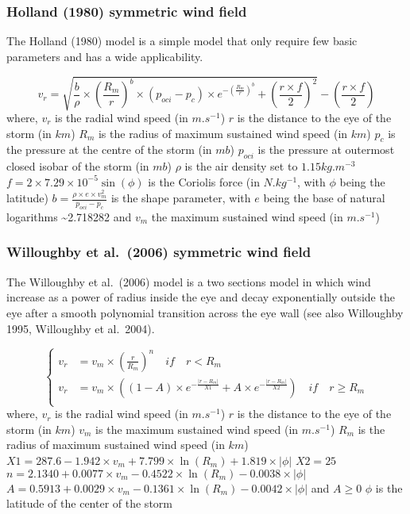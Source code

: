 \documentclass[
]{article}
\begin{document}
\hypertarget{holland-1980-symmetric-wind-field}{%
\subsubsection{Holland (1980) symmetric wind
field}\label{holland-1980-symmetric-wind-field}}

The Holland (1980) model is a simple model that only require few basic
parameters and has a wide applicability.

\[
v_r = \sqrt{\frac{b}{\rho} \times \left(\frac{R_m}{r}\right)^b \times (p_{oci} - p_c) \times e^{-\left(\frac{R_m}{r}\right)^b} + \left(\frac{r \times f}{2}\right)^2} - \left(\frac{r \times f}{2}\right)
\] where, \(v_r\) is the radial wind speed (in \(m.s^{-1}\)) \(r\) is
the distance to the eye of the storm (in \(km\)) \(R_m\) is the radius
of maximum sustained wind speed (in \(km\)) \(p_c\) is the pressure at
the centre of the storm (in \(mb\)) \(p_{oci}\) is the pressure at
outermost closed isobar of the storm (in \(mb\)) \(\rho\) is the air
density set to \(1.15 kg.m^{-3}\)
\(f = 2 \times 7.29 \times 10^{-5} \sin(\phi)\) is the Coriolis force
(in \(N.kg^{-1}\), with \(\phi\) being the latitude)
\(b = \frac{\rho \times e \times v_m^2}{p_{oci} - p_c}\) is the shape
parameter, with \(e\) being the base of natural logarithms
\textasciitilde2.718282 and \(v_m\) the maximum sustained wind speed (in
\(m.s^{-1}\))

\hypertarget{willoughby-et-al.-2006-symmetric-wind-field}{%
\subsubsection{Willoughby et al.~(2006) symmetric wind
field}\label{willoughby-et-al.-2006-symmetric-wind-field}}

The Willoughby et al.~(2006) model is a two sections model in which wind
increase as a power of radius inside the eye and decay exponentially
outside the eye after a smooth polynomial transition across the eye wall
(see also Willoughby 1995, Willoughby et al.~2004).

\[
\left\{
\begin{aligned}
v_r &= v_m \times \left(\frac{r}{R_m}\right)^{n} \quad if \quad r < R_m \\
v_r &= v_m \times \left((1-A) \times e^{-\frac{|r-R_m|}{X1}} + A \times e^{-\frac{|r-R_m|}{X2}}\right) \quad if \quad r \geq R_m \\
\end{aligned}
\right.
\] where, \(v_r\) is the radial wind speed (in \(m.s^{-1}\)) \(r\) is
the distance to the eye of the storm (in \(km\)) \(v_m\) is the maximum
sustained wind speed (in \(m.s^{-1}\)) \(R_m\) is the radius of maximum
sustained wind speed (in \(km\))
\(X1 = 287.6 - 1.942 \times v_m + 7.799 \times \ln(R_m) + 1.819 \times |\phi|\)
\(X2 = 25\)
\(n = 2.1340 + 0.0077 \times v_m - 0.4522 \times \ln(R_m) - 0.0038 \times |\phi|\)
\(A = 0.5913 + 0.0029 \times v_m - 0.1361 \times \ln(R_m) - 0.0042 \times |\phi|\)
and \(A\ge0\) \(\phi\) is the latitude of the center of the storm
\end{document}
